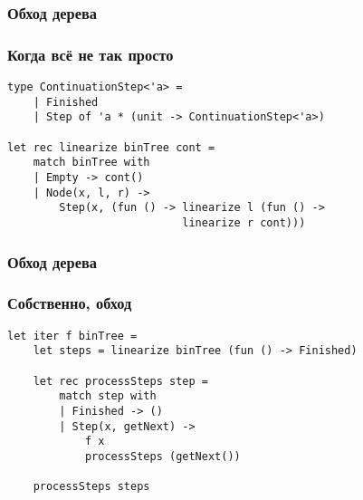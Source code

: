 \documentclass{../../slides-style}
\begin{document}
    \begin{frame}[fragile]
        \frametitle{Обход дерева}
        \frametitle{Когда всё не так просто}
        \begin{verbatim}
type ContinuationStep<'a> =
    | Finished
    | Step of 'a * (unit -> ContinuationStep<'a>)

let rec linearize binTree cont =
    match binTree with
    | Empty -> cont()
    | Node(x, l, r) ->
        Step(x, (fun () -> linearize l (fun () -> 
                           linearize r cont)))
        \end{verbatim}
    \end{frame}

    \begin{frame}[fragile]
        \frametitle{Обход дерева}
        \frametitle{Собственно, обход}
        \begin{verbatim}
let iter f binTree =
    let steps = linearize binTree (fun () -> Finished)

    let rec processSteps step =
        match step with
        | Finished -> ()
        | Step(x, getNext) -> 
            f x
            processSteps (getNext())
    
    processSteps steps
        \end{verbatim}
    \end{frame}
\end{document}
